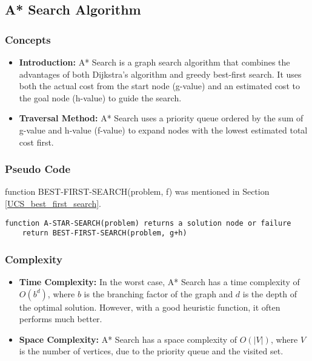 \subsection{A* Search Algorithm}
\subsubsection*{Concepts}
\begin{itemize}
    \item \textbf{Introduction:} A* Search is a graph search algorithm that combines the advantages of both Dijkstra's algorithm and greedy best-first search. It uses both the actual cost from the start node (g-value) and an estimated cost to the goal node (h-value) to guide the search.
    \item \textbf{Traversal Method:} A* Search uses a priority queue ordered by the sum of g-value and h-value (f-value) to expand nodes with the lowest estimated total cost first.
\end{itemize}

\subsubsection*{Pseudo Code}
function BEST-FIRST-SEARCH(problem, f) was mentioned in Section \ref{UCS_best_first_search}.
\begin{verbatim}
function A-STAR-SEARCH(problem) returns a solution node or failure
    return BEST-FIRST-SEARCH(problem, g+h)
\end{verbatim}

\subsubsection*{Complexity}
\begin{itemize}
    \item \textbf{Time Complexity:} In the worst case, A* Search has a time complexity of \( O(b^d) \), where \( b \) is the branching factor of the graph and \( d \) is the depth of the optimal solution. However, with a good heuristic function, it often performs much better.
    \item \textbf{Space Complexity:} A* Search has a space complexity of \( O(|V|) \), where \( V \) is the number of vertices, due to the priority queue and the visited set.
\end{itemize}

